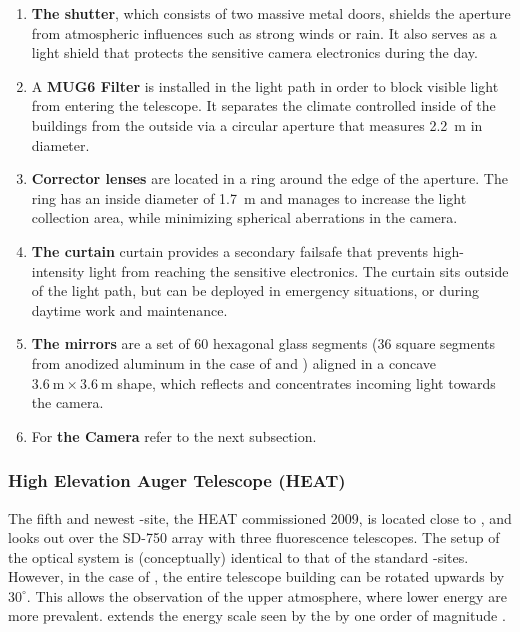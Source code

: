 \begin{enumerate}[label=(\Alph*)]
  \item \textbf{The shutter}, which consists of two massive metal doors, shields
  the aperture from atmospheric influences such as strong winds or rain. It also
  serves as a light shield that protects the sensitive camera electronics during
  the day.

  \item A \textbf{MUG6 \UV Filter} is installed in the light path in order to 
  block visible light from entering the telescope. It separates the climate 
  controlled inside of the \FD buildings from the outside via a circular
  aperture that measures \SI{2.2}{\meter} in diameter. 
  
  \item \textbf{Corrector lenses} are located in a ring around the edge of the 
  aperture. The ring has an inside diameter of \SI{1.7}{\meter} and manages to 
  increase the light collection area, while minimizing spherical aberrations in 
  the camera.

  \item \textbf{The curtain} curtain provides a secondary failsafe that prevents
  high-intensity light from reaching the sensitive electronics. The curtain 
  sits outside of the light path, but can be deployed in emergency situations, 
  or during daytime work and maintenance.

  \item \textbf{The mirrors} are a set of 60 hexagonal glass segments (36 square
  segments from anodized aluminum in the case of \LL and \LM) aligned in a 
  concave $\SI{3.6}{\meter}\times\SI{3.6}{\meter}$ shape, which reflects and 
  concentrates incoming light towards the camera.

  \item For \textbf{the Camera} refer to the next subsection.
\end{enumerate}

\subsubsection{High Elevation Auger Telescope (HEAT)}
\label{sssec:HEAT}

The fifth and newest \FD-site, the \acl{HEAT} commissioned 2009, is located 
close to \CO, and looks out over the SD-750 array with three fluorescence 
telescopes. The setup of the optical system is (conceptually) identical to that 
of the standard \FD-sites. However, in the case of \HEAT, the entire telescope 
building can be rotated upwards by $30^\circ$. This allows the observation of 
the upper atmosphere, where lower energy \EASs are more prevalent. \HEAT extends
the energy scale seen by the \FD by one order of magnitude 
\cite{mathesHEATTelescopesPierre2011}.


